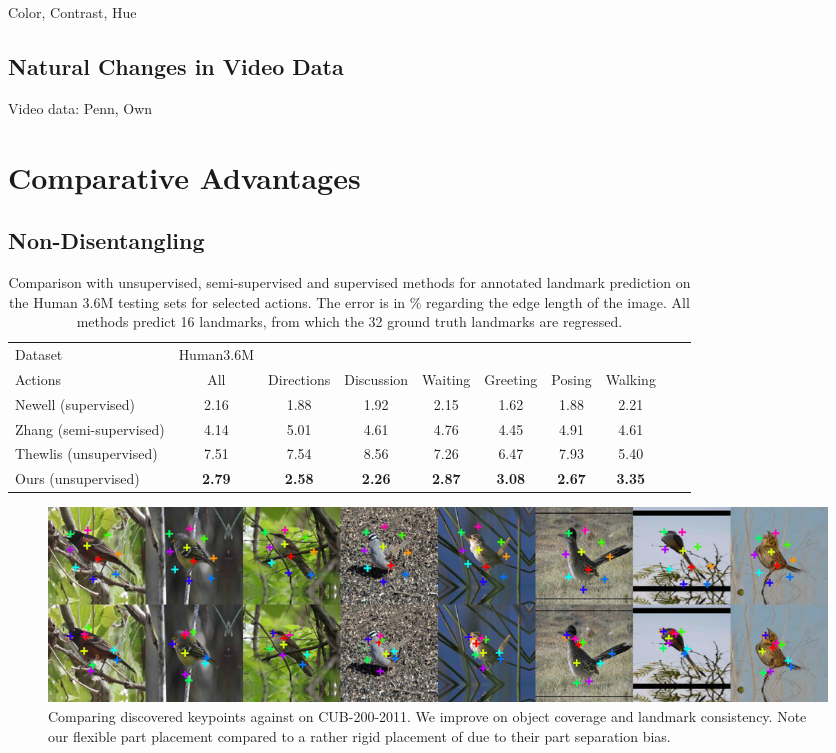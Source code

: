 			Color, Contrast, Hue
			\subsection{Natural Changes in Video Data}
			Video data: Penn, Own

	\section{Comparative Advantages}
		\subsection{Non-Disentangling}
			\begin{table}[!ht]
				\centering
				\begin{tabular}{l|ccccccccr}
				\hline
				Dataset & Human3.6M &  &  &  & &  &  \\
				Actions & {\footnotesize All} & {\footnotesize Directions} & {\footnotesize Discussion} &  {\footnotesize Waiting }& {\footnotesize Greeting }& {\footnotesize Posing} & {\footnotesize Walking} \\
				\hline
				Newell \cite{hourglass} (supervised)
				&2.16 &1.88 &1.92 &2.15 &1.62 &1.88 &2.21 \\
				Zhang \cite{Zhang18}  (semi-supervised)
				& 4.14 & 5.01 & 4.61 & 4.76 & 4.45 & 4.91 & 4.61 \\  \hline
				Thewlis \cite{thewlis17}  (unsupervised)
				& 7.51 & 7.54 & 8.56 & 7.26 & 6.47 & 7.93 & 5.40 \\
				Ours (unsupervised) & \textbf{2.79} & \textbf{2.58} & \textbf{2.26} & \textbf{2.87} & \textbf{3.08} & \textbf{2.67} & \textbf{3.35}\\
				\hline
				\end{tabular}
				\caption{{Comparison with unsupervised, semi-supervised and supervised methods for annotated landmark prediction on the Human 3.6M testing sets for selected actions. The
				error is in \% regarding the edge length of the image. All methods predict 16 landmarks, from which the 32 ground truth landmarks are regressed.}}
				\label{tab:gtregressionhuman}
			\end{table}

			\begin{figure}[htp]
				\centering
				\includegraphics[trim={0cm 0cm 0cm 0cm},clip, width=1.\linewidth]{fig/shape/comp}
				\caption{Comparing discovered keypoints against \cite{zhang18} on CUB-200-2011. We improve on object coverage and landmark consistency. Note our flexible part placement compared to a rather rigid placement of \cite{zhang18} due to their part separation bias.}
				\label{fig:compare}
			\end{figure}

